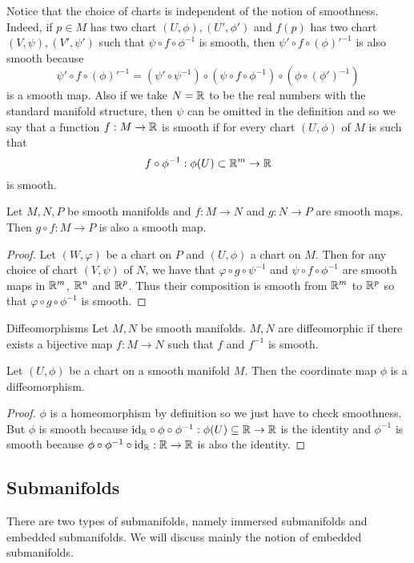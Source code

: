 \documentclass[a4paper]{article}
\begin{document}
Notice that the choice of charts is independent of the notion of smoothness. Indeed, if $p\in M$ has two chart $(U,\phi),(U',\phi')$ and $f(p)$ has two chart $(V,\psi),(V',\psi')$ such that $\psi\circ f\circ\phi^{-1}$ is smooth, then $\psi'\circ f\circ(\phi)'^{-1}$ is also smooth because $$\psi'\circ f\circ(\phi)'^{-1}=\left(\psi'\circ\psi^{-1}\right)\circ\left(\psi\circ f\circ\phi^{-1}\right)\circ\left(\phi\circ(\phi')^{-1}\right)$$ is a smooth map. Also if we take $N=\mathbb{R}$ to be the real numbers with the standard manifold structure, then $\psi$ can be omitted in the definition and so we say that a function $f:M\to\mathbb{R}$ is smooth if for every chart $(U,\phi)$ of $M$ is such that $$f\circ\phi^{-1}:\phi(U)\subset\mathbb{R}^m\to\mathbb{R}$$ is smooth. 

\begin{prp}{}{} Let $M,N,P$ be smooth manifolds and $f:M\to N$ and $g:N\to P$ are smooth maps. Then $g\circ f:M\to P$ is also a smooth map. \tcbline
\begin{proof}
Let $(W,\varphi)$ be a chart on $P$ and $(U,\phi)$ a chart on $M$. Then for any choice of chart $(V,\psi)$ of $N$, we have that $\varphi\circ g\circ\psi^{-1}$ and $\psi\circ f\circ\phi^{-1}$ are smooth maps in $\mathbb{R}^m$, $\mathbb{R}^n$ and $\mathbb{R}^p$. Thus their composition is smooth from $\mathbb{R}^m$ to $\mathbb{R}^p$ so that $\varphi\circ g\circ\phi^{-1}$ is smooth. 
\end{proof}
\end{prp}

\begin{defn}{Diffeomorphisms}{} Let $M,N$ be smooth manifolds. $M,N$ are diffeomorphic if there exists a bijective map $f:M\to N$ such that $f$ and $f^{-1}$ is smooth. 
\end{defn}

\begin{prp}{}{} Let $(U,\phi)$ be a chart on a smooth manifold $M$. Then the coordinate map $\phi$ is a diffeomorphism. \tcbline
\begin{proof}
$\phi$ is a homeomorphism by definition so we just have to check smoothness. But $\phi$ is smooth because $\text{id}_{\mathbb{R}}\circ\phi\circ\phi^{-1}:\phi(U)\subseteq\mathbb{R}\to\mathbb{R}$ is the identity and $\phi^{-1}$ is smooth because $\phi\circ\phi^{-1}\circ\text{id}_{\mathbb{R}}:\mathbb{R}\to\mathbb{R}$ is also the identity. 
\end{proof}
\end{prp}

\subsection{Submanifolds}
There are two types of submanifolds, namely immersed submanifolds and embedded submanifolds. We will discuss mainly the notion of embedded submanifolds. 
\end{document}

